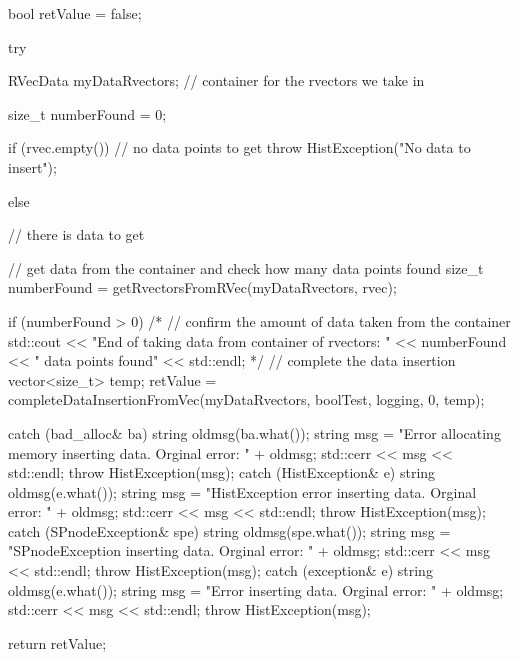 \begin{DoxyCode}
{
    bool retValue = false;

    try {

        RVecData myDataRvectors; // container for the rvectors we take in

        size_t numberFound = 0;

        if (rvec.empty()) { // no data points to get
            throw HistException("No data to insert");
        }

        else { // there is data to get

            // get data from the container and check how many data points found
            size_t numberFound = getRvectorsFromRVec(myDataRvectors, rvec);


            if (numberFound > 0) {
                /*
                // confirm the amount of data taken from the container
                std::cout << "End of taking data from container of rvectors: "
                    << numberFound << " data points found" << std::endl;
                */
                // complete the data insertion
           vector<size_t> temp;
                retValue = completeDataInsertionFromVec(myDataRvectors,
                                                        boolTest, logging, 0,
                                      temp);
            }
        }
    }
    catch (bad_alloc& ba) {
         string oldmsg(ba.what());
        string msg = "Error allocating memory inserting data.  Orginal error: "
                                            + oldmsg;
        std::cerr << msg << std::endl;
        throw HistException(msg);
    }
    catch (HistException& e) {
        string oldmsg(e.what());
        string msg = "HistException error inserting data.  Orginal error: "
                                    + oldmsg;
        std::cerr << msg << std::endl;
        throw HistException(msg);
    }
    catch (SPnodeException& spe) {
        string oldmsg(spe.what());
        string msg = "SPnodeException inserting data.  Orginal error: " + 
      oldmsg;
        std::cerr << msg << std::endl;
        throw HistException(msg);
    }
    catch (exception& e) {
        string oldmsg(e.what());
        string msg = "Error inserting data.  Orginal error: " + oldmsg;
        std::cerr << msg << std::endl;
        throw HistException(msg);
    }

    return retValue;

}
\end{DoxyCode}

